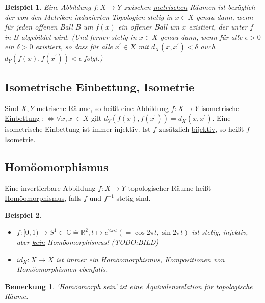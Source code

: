 \documentclass[a4paper,11pt,notitlepage]{report}
\newtheorem{remark}{Bemerkung}[chapter]
\newtheorem{example}{Beispiel}[chapter]
\newcommand{\R}{{\ensuremath{\mathbb{R}}}}
\newcommand{\C}{{\ensuremath{\mathbb{C}}}}
\newenvironment{Kasten}[1]
{
\hspace{0.05\linewidth}
\begin{center}
\begin{minipage}{0.9\linewidth}
\setlength{\fboxsep}{10pt}
\definecolor{shadecolor}{gray}{1}
\definecolor{framecolor}{gray}{0}
\def\FrameCommand{\fcolorbox{framecolor}{shadecolor}}
\MakeFramed {\FrameRestore}
\subsection{#1}
\begin{itshape}
}
{
\end{itshape}
\endMakeFramed
\end{minipage}
\end{center}
}
\begin{document}
\begin{example}
	Eine Abbildung $f \colon X \rightarrow Y$ zwischen \underline{metrischen} Räumen ist bezüglich der von den Metriken induzierten Topologien stetig in $x \in X$ genau dann, wenn für jeden offenen Ball $B$ um $f(x)$ ein offener Ball um $x$ existiert, der unter $f$ in $B$ abgebildet wird. (Und ferner stetig in $x \in X$ genau dann, wenn für alle $\epsilon > 0$ ein $\delta > 0$ existiert, so dass für alle $x^\prime \in X$ mit $d_X(x,x^\prime) < \delta$ auch $d_Y \left( f(x), f(x^\prime) \right) < \epsilon$ folgt.) 
\end{example}

\begin{Kasten}{Isometrische Einbettung, Isometrie}
	Sind $X,Y$ metrische Räume, so heißt eine Abbildung $f \colon X \rightarrow Y$ \underline{isometrische Einbettung}
	\newline	
	 $: \Leftrightarrow \forall x, x^\prime \in X$ gilt $d_Y \left ( f(x), f(x^\prime) \right ) = d_X (x, x^\prime)$.
	\newline
	Eine isometrische Einbettung ist immer injektiv.
	\newline
	Ist $f$ zusätzlich \underline{bijektiv}, so heißt $f$ \underline{\underline{Isometrie}}. 
\end{Kasten}

\begin{Kasten}{Homöomorphismus}
	Eine invertierbare Abbildung $f \colon X \rightarrow Y$ topologischer Räume heißt \underline{Homöomorphismus}, falls $f$ und $f^{-1}$ stetig sind.
\end{Kasten}

\begin{example}
	\begin{itemize}
		\item $f \colon [0,1) \rightarrow S^1 \subset \C \hat{=} \R^2, t \mapsto e^{2 \pi i t} (= \cos {2 \pi t}, \sin {2 \pi t})$ ist stetig, injektiv, aber \underline{kein} Homöomorphismus!
		\newline
		(TODO:BILD)
		\item $id_X \colon X \rightarrow X$ ist immer ein Homöomorphismus, Kompositionen von Homöomorphismen ebenfalls.
	\end{itemize}
\end{example}

\begin{remark}
	`Homöomorph sein' ist eine Äquivalenzrelation für topologische Räume.
\end{remark}
\end{document}
